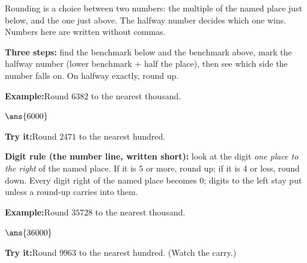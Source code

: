 \documentclass[12pt]{article}
\begin{document}

\noindent\small Rounding is a choice between two numbers: the multiple of the
named place just below, and the one just above. The halfway number decides
which one wins. Numbers here are written without commas.
\normalsize

\begin{formulabox}
\textbf{Three steps:} find the benchmark below and the benchmark above, mark
the halfway number (lower benchmark $+$ half the place), then see which side
the number falls on. On halfway exactly, round up.
\begin{center}
\end{center}
\end{formulabox}
\begin{examplebox}
\textbf{Example:}\quad Round $6382$ to the nearest thousand.
\par
$\ans{6000}$
\end{examplebox}
\begin{tryitbox}
\textbf{Try it:}\quad Round $2471$ to the nearest hundred.\\[2pt]
\end{tryitbox}

\begin{formulabox}
\textbf{Digit rule (the number line, written short):} look at the digit
\emph{one place to the right} of the named place. If it is $5$ or more, round
up; if it is $4$ or less, round down. Every digit right of the named place
becomes $0$; digits to the left stay put unless a round-up carries into them.
\end{formulabox}
\begin{examplebox}
\textbf{Example:}\quad Round $35728$ to the nearest thousand.
\par
$\ans{36000}$
\end{examplebox}
\begin{tryitbox}
\textbf{Try it:}\quad Round $9963$ to the nearest hundred. (Watch the
carry.)\\[2pt]
\end{tryitbox}
\end{document}

